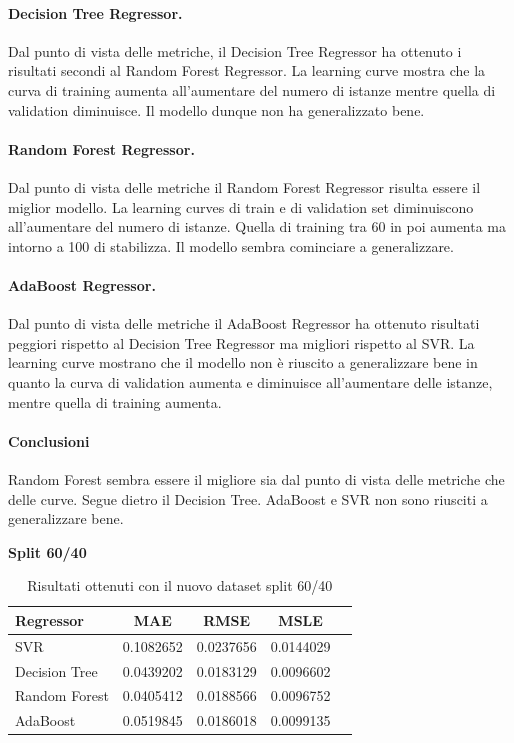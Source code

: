 \paragraph{\textbf{Decision Tree Regressor}.}
Dal punto di vista delle metriche, il Decision Tree Regressor ha ottenuto i risultati secondi al Random Forest Regressor. 
La learning curve mostra che la curva di training aumenta all'aumentare del numero di istanze mentre quella di validation diminuisce. Il modello dunque non ha generalizzato bene.
\paragraph{\textbf{Random Forest Regressor}.}
Dal punto di vista delle metriche il Random Forest Regressor risulta essere il miglior modello.
La learning curves di train e di validation set diminuiscono all'aumentare del numero di istanze. Quella di training tra 60 in poi aumenta ma intorno a 100 di stabilizza. Il modello sembra cominciare a generalizzare.
\paragraph{\textbf{AdaBoost Regressor}.}
Dal punto di vista delle metriche il AdaBoost Regressor ha ottenuto risultati peggiori rispetto al Decision Tree Regressor ma migliori rispetto al SVR.
La learning curve mostrano che il modello non è riuscito a generalizzare bene
in quanto la curva di validation aumenta e diminuisce all'aumentare delle istanze, mentre quella di training aumenta.

\paragraph{\textbf{Conclusioni}} Random Forest sembra essere il migliore sia dal punto di vista delle metriche che delle curve. Segue dietro il Decision Tree. AdaBoost e SVR non sono riusciti a generalizzare bene.



\noindent\textbf{Split 60/40}

\begin{table}[H]
    \centering
    \begin{tabular}{|>{\centering\arraybackslash}m{5cm}|c|c|c|c|}
        \hline
        \textbf{Regressor} & \textbf{MAE} & \textbf{RMSE} & \textbf{MSLE} \\ [10pt]
        \hline
        SVR & 0.1082652 & 0.0237656 & 0.0144029 \\ [10pt]
        \hline
        Decision Tree & 0.0439202 & 0.0183129 & 0.0096602 \\ [10pt]
        \hline
        Random Forest & 0.0405412 & 0.0188566 & 0.0096752 \\ [10pt]
        \hline
        AdaBoost & 0.0519845 & 0.0186018 & 0.0099135 \\ [10pt]
        \hline
    \end{tabular}
    \caption{Risultati ottenuti con il nuovo dataset split 60/40}
    \label{tab:results}
\end{table}

